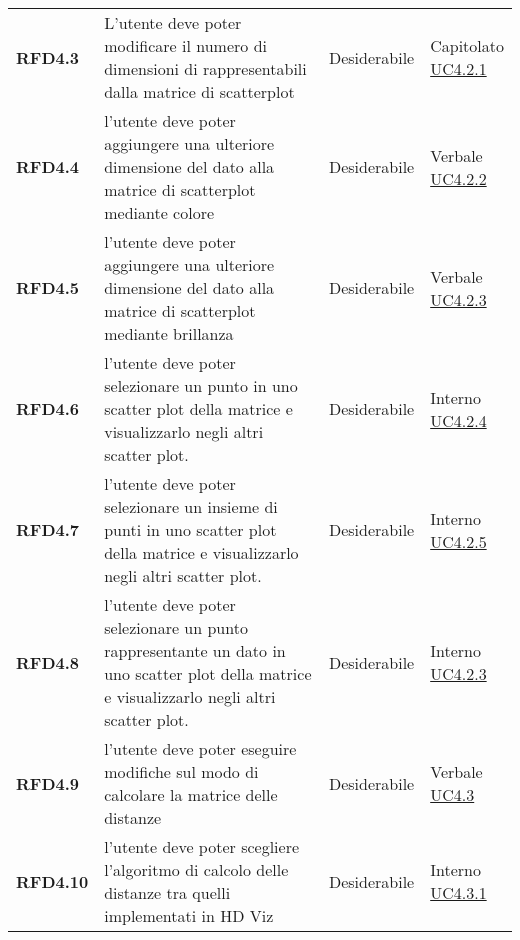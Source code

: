 \begin{longtable}[H]{>{\raggedright\bfseries}m{20mm} >{\raggedright}m{90mm} >{\raggedright}m{28mm} >{\raggedright\arraybackslash}m{30mm}}
    RFD4.3
    & L'utente deve poter modificare il numero di dimensioni di rappresentabili dalla matrice di scatterplot
    & Desiderabile
    & \makecell{ Capitolato \\ \hyperref[par:uc4.2.1]{UC4.2.1} }\\

    RFD4.4
    & l'utente deve poter aggiungere una ulteriore dimensione del dato alla matrice di scatterplot mediante colore
    & Desiderabile
    & \makecell{ Verbale \\ \hyperref[par:uc4.2.2]{UC4.2.2} }\\

    RFD4.5
    & l'utente deve poter aggiungere una ulteriore dimensione del dato alla matrice di scatterplot mediante brillanza
    & Desiderabile
    & \makecell{ Verbale \\ \hyperref[par:uc4.2.3]{UC4.2.3} }\\

    RFD4.6
    & l'utente deve poter selezionare un punto in uno scatter plot della matrice e visualizzarlo negli altri scatter plot.
    & Desiderabile
    & \makecell{ Interno \\ \hyperref[par:uc4.2.4]{UC4.2.4} }\\

    RFD4.7
    & l'utente deve poter selezionare un insieme di punti in uno scatter plot della matrice e visualizzarlo negli altri scatter plot.
    & Desiderabile
    & \makecell{ Interno \\ \hyperref[par:uc4.2.5]{UC4.2.5} }\\

    RFD4.8
    & l'utente deve poter selezionare un punto rappresentante un dato in uno scatter plot della matrice e visualizzarlo negli altri scatter plot.
    & Desiderabile
    & \makecell{ Interno \\ \hyperref[par:uc4.2.3]{UC4.2.3} }\\
    
    RFD4.9
    & l'utente deve poter eseguire modifiche sul modo di calcolare la matrice delle distanze
    & Desiderabile
    & \makecell{ Verbale \\ \hyperref[ssub:uc4.3]{UC4.3} }\\

    RFD4.10
    & l'utente deve poter scegliere l'algoritmo di calcolo delle distanze tra quelli implementati in HD Viz
    & Desiderabile
    & \makecell{ Interno \\ \hyperref[par:uc4.3.1]{UC4.3.1} }\\


\end{longtable}
